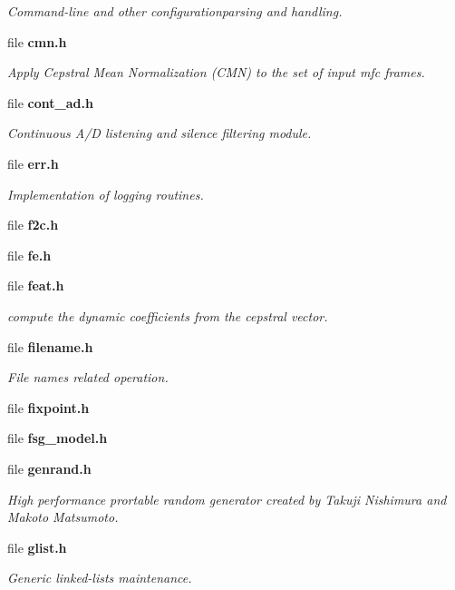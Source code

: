\begin{DoxyCompactItemize}
\begin{DoxyCompactList}\small\item\em Command-\/line and other configurationparsing and handling. \end{DoxyCompactList}\item 
file {\bf cmn.\-h}
\begin{DoxyCompactList}\small\item\em Apply Cepstral Mean Normalization (C\-M\-N) to the set of input mfc frames. \end{DoxyCompactList}\item 
file {\bf cont\-\_\-ad.\-h}
\begin{DoxyCompactList}\small\item\em Continuous A/\-D listening and silence filtering module. \end{DoxyCompactList}\item 
file {\bf err.\-h}
\begin{DoxyCompactList}\small\item\em Implementation of logging routines. \end{DoxyCompactList}\item 
file {\bfseries f2c.\-h}
\item 
file {\bfseries fe.\-h}
\item 
file {\bf feat.\-h}
\begin{DoxyCompactList}\small\item\em compute the dynamic coefficients from the cepstral vector. \end{DoxyCompactList}\item 
file {\bf filename.\-h}
\begin{DoxyCompactList}\small\item\em File names related operation. \end{DoxyCompactList}\item 
file {\bfseries fixpoint.\-h}
\item 
file {\bfseries fsg\-\_\-model.\-h}
\item 
file {\bf genrand.\-h}
\begin{DoxyCompactList}\small\item\em High performance prortable random generator created by Takuji Nishimura and Makoto Matsumoto. \end{DoxyCompactList}\item 
file {\bf glist.\-h}
\begin{DoxyCompactList}\small\item\em Generic linked-\/lists maintenance. \end{DoxyCompactList}\item 

\end{DoxyCompactItemize}
